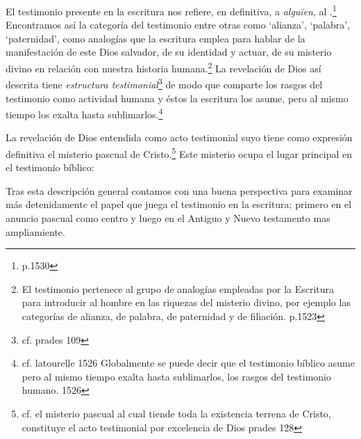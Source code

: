 El testimonio presente en la escritura nos refiere, en definitiva, a
\emph{alguien}, al .\footnote{p.1530} Encontramos así la
categoría del testimonio entre otras como `alianza', `palabra', `paternidad',
como analogías que la escritura emplea para hablar de la manifestación de este
Dios salvador, de su identidad y actuar, de su misterio divino en relación con
nuestra historia humana.\footnote{El testimonio pertenece al grupo de analogías
  empleadas por la Escritura para introducir al hombre en las riquezas del
  misterio divino, por ejemplo las categorías de alianza, de palabra, de
  paternidad y de filiación. p.1523} La revelación de Dios así descrita tiene
\emph{estructura testimonial}\footnote{cf. prades 109} de modo que comparte los
rasgos del testimonio como actividad humana y éstos la escritura los asume, pero
al mismo tiempo los exalta hasta sublimarlos.\footnote{cf. latourelle 1526
  Globalmente se puede decir que el testimonio bíblico asume pero al mismo
  tiempo exalta hasta sublimarlos, los rasgos del testimonio humano. 1526}

La revelación de Dios entendida como acto testimonial suyo tiene como expresión
definitiva el misterio pascual de Cristo.\footnote{cf. el misterio pascual al
  cual tiende toda la existencia terrena de Cristo, constituye el acto
  testimonial por excelencia de Dios prades 128} Este misterio ocupa el lugar
principal en el testimonio bíblico:

Tras esta descripción general contamos con una buena perspectiva para examinar
más detenidamente el papel que juega el testimonio en la escritura; primero en
el anuncio pascual como centro y luego en el Antiguo y Nuevo testamento mas
ampliamiente.


